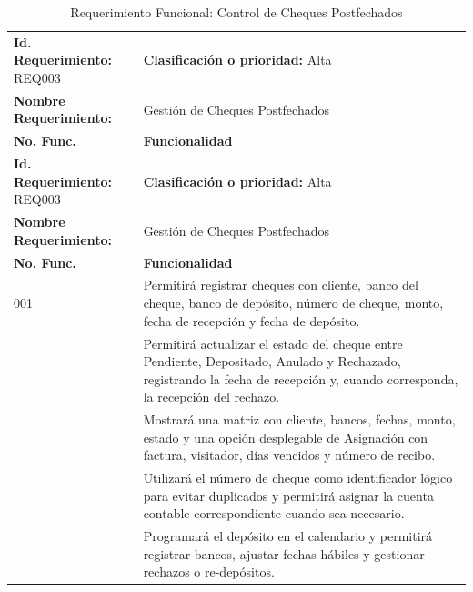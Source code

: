{
\small
{}
\setlength{\parindent}{0pt}
\begin{xltabular}{\linewidth}{
    >{\raggedright\arraybackslash}p{4.2cm} 
    >{\raggedright\arraybackslash}X
}

    \caption{Requerimiento Funcional: Control de Cheques Postfechados} \label{tab:req003_cheques} \\
    \toprule
    \textbf{Id. Requerimiento:} REQ003 & \textbf{Clasificación o prioridad:} Alta \\
    \textbf{Nombre Requerimiento:} & Gestión de Cheques Postfechados \\
    \textbf{No. Func.} & \textbf{Funcionalidad} \\
    \midrule
    \endfirsthead

    \toprule
    \textbf{Id. Requerimiento:} REQ003 & \textbf{Clasificación o prioridad:} Alta \\
    \textbf{Nombre Requerimiento:} & Gestión de Cheques Postfechados \\
    \textbf{No. Func.} & \textbf{Funcionalidad} \\
    \midrule
    \endhead

    \endfoot

    \bottomrule
\endlastfoot

    001 & Permitirá registrar cheques con cliente, banco del cheque, banco de depósito, número de cheque, monto, fecha de recepción y fecha de depósito.  \\
     & Permitirá actualizar el estado del cheque entre Pendiente, Depositado, Anulado y Rechazado, registrando la fecha de recepción y, cuando corresponda, la recepción del rechazo. \\
     & Mostrará una matriz con cliente, bancos, fechas, monto, estado y una opción desplegable de Asignación con factura, visitador, días vencidos y número de recibo. \\
     & Utilizará el número de cheque como identificador lógico para evitar duplicados y permitirá asignar la cuenta contable correspondiente cuando sea necesario. \\
     & Programará el depósito en el calendario y permitirá registrar bancos, ajustar fechas hábiles y gestionar rechazos o re-depósitos. \\
\end{xltabular}
}

